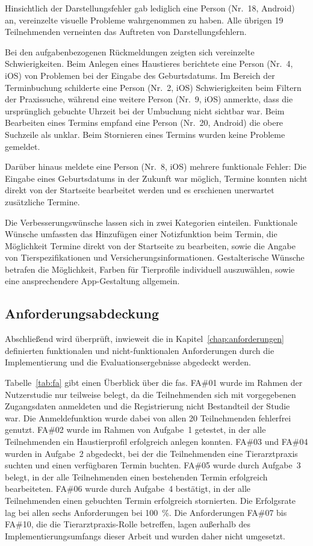 Hinsichtlich der Darstellungsfehler gab lediglich eine Person 
(Nr.~18, Android) an, vereinzelte visuelle Probleme wahrgenommen 
zu haben. Alle übrigen 19 Teilnehmenden verneinten das Auftreten 
von Darstellungsfehlern.

Bei den aufgabenbezogenen Rückmeldungen zeigten sich vereinzelte 
Schwierigkeiten. Beim Anlegen eines Haustieres berichtete eine 
Person (Nr.~4, iOS) von Problemen bei der Eingabe des 
Geburtsdatums. Im Bereich der Terminbuchung schilderte eine Person (Nr.~2, iOS) Schwierigkeiten beim Filtern der Praxissuche, während eine weitere Person (Nr.~9, iOS) anmerkte, dass die ursprünglich gebuchte Uhrzeit bei der Umbuchung nicht sichtbar war. Beim Bearbeiten eines Termins empfand eine Person (Nr.~20, Android) die obere Suchzeile als unklar. Beim Stornieren eines Termins wurden keine Probleme gemeldet.

Darüber hinaus meldete eine Person (Nr.~8, iOS) mehrere 
funktionale Fehler: Die Eingabe eines Geburtsdatums in der Zukunft war möglich, Termine konnten nicht direkt von der Startseite bearbeitet werden und es erschienen unerwartet zusätzliche Termine.

Die Verbesserungswünsche lassen sich in zwei Kategorien einteilen. Funktionale Wünsche umfassten das Hinzufügen einer Notizfunktion beim Termin, die Möglichkeit Termine direkt von der Startseite zu bearbeiten, sowie die Angabe von Tierspezifikationen und Versicherungsinformationen. Gestalterische Wünsche betrafen die Möglichkeit, Farben für Tierprofile individuell auszuwählen, sowie 
eine ansprechendere App-Gestaltung allgemein.

\subsection{Anforderungsabdeckung}
Abschließend wird überprüft, inwieweit die in Kapitel~\ref{chap:anforderungen} definierten funktionalen und nicht-funktionalen Anforderungen durch die Implementierung und die Evaluationsergebnisse abgedeckt werden.

Tabelle~\ref{tab:fa} gibt einen Überblick über die \gls{fas}. FA\#01 wurde im Rahmen der Nutzerstudie nur teilweise belegt, da die Teilnehmenden sich mit vorgegebenen Zugangsdaten anmeldeten und die Registrierung nicht Bestandteil der Studie war. Die Anmeldefunktion wurde dabei von allen 20 Teilnehmenden fehlerfrei genutzt. FA\#02 wurde im Rahmen von Aufgabe~1 getestet, in der alle Teilnehmenden ein Haustierprofil erfolgreich anlegen konnten. FA\#03 und FA\#04 wurden in Aufgabe~2 abgedeckt, bei der die Teilnehmenden eine Tierarztpraxis suchten und einen verfügbaren Termin buchten. FA\#05 wurde durch Aufgabe~3 belegt, in der alle Teilnehmenden einen bestehenden Termin erfolgreich bearbeiteten. FA\#06 wurde durch Aufgabe~4 bestätigt, in der alle Teilnehmenden einen gebuchten Termin erfolgreich stornierten. Die Erfolgsrate lag bei allen sechs Anforderungen bei 100~\%. Die Anforderungen FA\#07 bis FA\#10, die die Tierarztpraxis-Rolle betreffen, lagen außerhalb des Implementierungsumfangs dieser Arbeit und wurden daher nicht umgesetzt.

